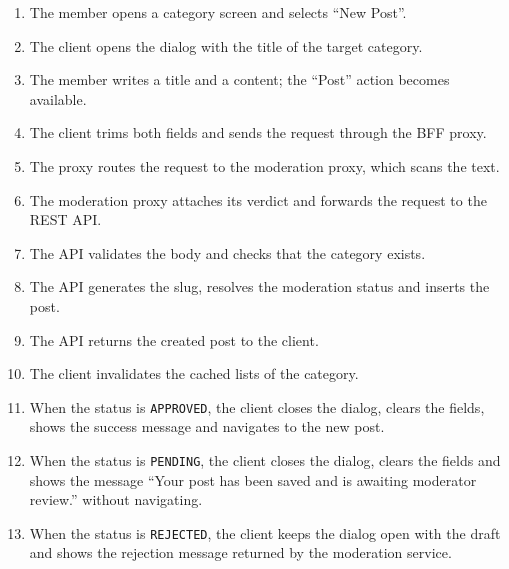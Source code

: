 \begin{enumerate}[leftmargin=1.8em,topsep=3pt,itemsep=2pt,parsep=0pt]
      \item The member opens a category screen and selects ``New Post''.
      \item The client opens the dialog with the title of the target category.
      \item The member writes a title and a content; the ``Post'' action becomes available.
      \item The client trims both fields and sends the request through the BFF proxy.
      \item The proxy routes the request to the moderation proxy, which scans the text.
      \item The moderation proxy attaches its verdict and forwards the request to the REST
            API.
      \item The API validates the body and checks that the category exists.
      \item The API generates the slug, resolves the moderation status and inserts the
            post.
      \item The API returns the created post to the client.
      \item The client invalidates the cached lists of the category.
      \item When the status is \texttt{APPROVED}, the client closes the dialog, clears the
            fields, shows the success message and navigates to the new post.
      \item When the status is \texttt{PENDING}, the client closes the dialog, clears the
            fields and shows the message ``Your post has been saved and is awaiting
            moderator review.'' without navigating.
      \item When the status is \texttt{REJECTED}, the client keeps the dialog open with the
            draft and shows the rejection message returned by the moderation service.
\end{enumerate}

